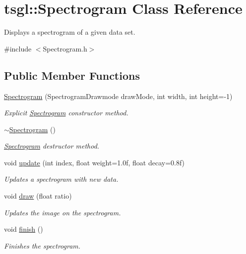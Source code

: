 \hypertarget{classtsgl_1_1_spectrogram}{}\section{tsgl\+:\+:Spectrogram Class Reference}
\label{classtsgl_1_1_spectrogram}


Displays a spectrogram of a given data set.  




{\ttfamily \#include $<$Spectrogram.\+h$>$}

\subsection*{Public Member Functions}
\begin{DoxyCompactItemize}
\item 
\hyperlink{classtsgl_1_1_spectrogram_a806d3244b086b9ed2c982b7178eb5139}{Spectrogram} (Spectrogram\+Drawmode draw\+Mode, int width, int height=-\/1)
\begin{DoxyCompactList}\small\item\em Explicit \hyperlink{classtsgl_1_1_spectrogram}{Spectrogram} constructor method. \end{DoxyCompactList}\item 
\hyperlink{classtsgl_1_1_spectrogram_abf1ff8d5acade39017321d6a2006f0f1}{$\sim$\+Spectrogram} ()
\begin{DoxyCompactList}\small\item\em \hyperlink{classtsgl_1_1_spectrogram}{Spectrogram} destructor method. \end{DoxyCompactList}\item 
void \hyperlink{classtsgl_1_1_spectrogram_a8fc0e145d5ad8673cc51876e698fb162}{update} (int index, float weight=1.\+0f, float decay=0.\+8f)
\begin{DoxyCompactList}\small\item\em Updates a spectrogram with new data. \end{DoxyCompactList}\item 
void \hyperlink{classtsgl_1_1_spectrogram_aef15257f0daa13a57d99cd621d402bd5}{draw} (float ratio)
\begin{DoxyCompactList}\small\item\em Updates the image on the spectrogram. \end{DoxyCompactList}\item 
void \hyperlink{classtsgl_1_1_spectrogram_a9e6eb0489ee0fb9f96b2a5202868a1c2}{finish} ()
\begin{DoxyCompactList}\small\item\em Finishes the spectrogram. \end{DoxyCompactList}\end{DoxyCompactItemize}


